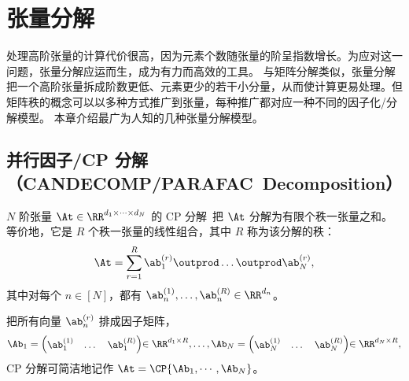\section{张量分解}\label{chapter:tensor-decomposition}
处理高阶张量的计算代价很高，因为元素个数随张量的阶呈指数增长。为应对这一问题，张量分解应运而生，成为有力而高效的工具。
与矩阵分解类似，张量分解把一个高阶张量拆成阶数更低、元素更少的若干小分量，从而使计算更易处理。但矩阵秩的概念可以以多种方式推广到张量，每种推广都对应一种不同的因子化/分解模型。
本章介绍最广为人知的几种张量分解模型。
\subsection{并行因子/CP 分解（CANDECOMP/PARAFAC~Decomposition）}\label{sec:cp-decomposition}
$N$ 阶张量 $\At\in\RR^{d_1\times\cdots\times d_N}$ 的 CP 分解~\citep{hitchcock1927expression}把 $\At$ 分解为有限个秩一张量之和。等价地，它是 $R$ 个秩一张量的线性组合，其中 $R$ 称为该分解的秩：
$$\At = \sum_{r=1}^R \ab^{(r)}_1\outprod\dots\outprod\ab^{(r)}_N ,$$
其中对每个 $n\in [N]$，都有 $\ab^{(1)}_n,\dots,\ab^{(R)}_n\in\RR^{d_n}$。

把所有向量 $\ab^{(r)}_n$ 排成因子矩阵，
\[\Ab_1 = {\begin{pmatrix}
\ab^{(1)}_1 & \dots & \ab^{(R)}_1 \\
\end{pmatrix}}{\in\RR^{d_1\times R}}, \dots ,\Ab_N = {\begin{pmatrix}
\ab^{(1)}_N & \dots & \ab^{(R)}_N \\
\end{pmatrix}}{\in\RR^{d_N\times R}}, \]
CP 分解可简洁地记作 $\At = \CP{\Ab_1,\cdots,\Ab_N}$。

